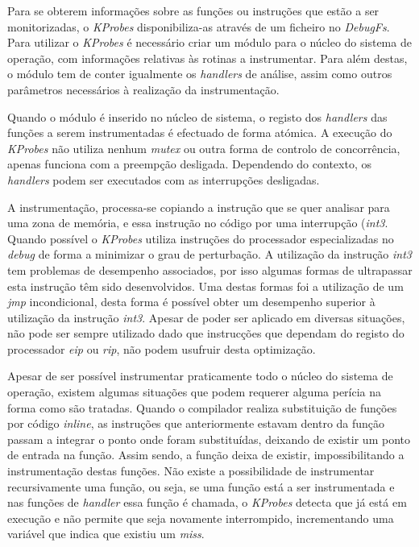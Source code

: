 Para se obterem informações sobre as funções ou instruções que estão a ser monitorizadas, o \textit{KProbes} disponibiliza-as através de um ficheiro no \textit{DebugFs}.
Para utilizar o \textit{KProbes} é necessário criar um módulo para o núcleo do sistema de operação, com informações relativas às rotinas a instrumentar.
Para além destas, o módulo tem de conter igualmente os \textit{handlers} de análise, assim como outros parâmetros necessários à realização da instrumentação.

Quando o módulo é inserido no núcleo de sistema, o registo dos \textit{handlers} das funções a serem instrumentadas é efectuado de forma atómica.
A execução do \textit{KProbes} não utiliza nenhum \textit{mutex} ou outra forma de controlo de concorrência, apenas funciona com a preempção desligada.
Dependendo do contexto, os \textit{handlers} podem ser executados com as interrupções desligadas.

A instrumentação, processa-se copiando a instrução que se quer analisar para uma zona de memória, e essa instrução no código por uma interrupção (\textit{int3}.
Quando possível o \textit{KProbes} utiliza instruções do processador especializadas no \textit{debug} de forma a minimizar o grau de perturbação.
A utilização da instrução \textit{int3} tem problemas de desempenho associados, por isso algumas formas de ultrapassar esta instrução têm sido desenvolvidos.
Uma destas formas foi a utilização de um \textit{jmp} incondicional, desta forma é possível obter um desempenho superior à utilização da instrução \textit{int3}.
Apesar de poder ser aplicado em diversas situações, não pode ser sempre utilizado dado que instrucções que dependam do registo do processador \textit{eip} ou \textit{rip}, não podem usufruir desta optimização.

Apesar de ser possível instrumentar praticamente todo o núcleo do sistema de operação, existem algumas situações que podem requerer alguma perícia na forma como são tratadas.
Quando o compilador realiza substituição de funções por código \textit{inline}, as instruções que anteriormente estavam dentro da função passam a integrar o ponto onde foram substituídas, deixando de existir um ponto de entrada na função.
Assim sendo, a função deixa de existir, impossibilitando a instrumentação destas funções.
Não existe a possibilidade de instrumentar recursivamente uma função, ou seja, se uma função está a ser instrumentada e nas funções de \textit{handler} essa função é chamada, o \textit{KProbes} detecta que já está em execução e não permite que seja novamente interrompido, incrementando uma variável que indica que existiu um \textit{miss}.

